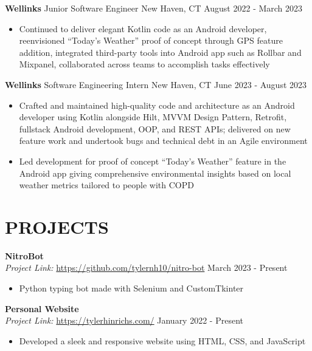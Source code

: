\documentclass[a4paper,10pt]{extarticle}
\begin{document}
\noindent
\textbf{Wellinks} \textbar \space Junior Software Engineer \hfill New Haven, CT \textbar \space August 2022 - March 2023 %
\begin{itemize}
    \item Continued to deliver elegant Kotlin code as an Android developer, reenvisioned “Today’s Weather” proof of concept through GPS feature addition, integrated third-party tools into Android app such as Rollbar and Mixpanel, collaborated across teams to accomplish tasks effectively %
\end{itemize}

\noindent
\textbf{Wellinks} \textbar \space Software Engineering Intern \hfill New Haven, CT \textbar \space June 2023 - August 2023 %
\begin{itemize}
    \item Crafted and maintained high-quality code and architecture as an Android developer using Kotlin alongside Hilt, MVVM Design Pattern, Retrofit, fullstack Android development, OOP, and REST APIs; delivered on new feature work and undertook bugs and technical debt in an Agile environment %
    \item Led development for proof of concept “Today’s Weather” feature in the Android app giving comprehensive environmental insights based on local weather metrics tailored to people with COPD

\end{itemize}

\section*{PROJECTS}
\noindent
\textbf{NitroBot}\\ %
\textit{Project Link:} \url{https://github.com/tylernh10/nitro-bot} \hfill March 2023 - Present %
\begin{itemize}[topsep=3pt]
    \item Python typing bot made with Selenium and CustomTkinter %
\end{itemize}

\noindent
\textbf{Personal Website}\\ %
\textit{Project Link:} \url{https://tylerhinrichs.com/} \hfill January 2022 - Present %
\begin{itemize}[topsep=3pt]
    \item Developed a sleek and responsive website using HTML, CSS, and JavaScript %
\end{itemize}
\end{document}
